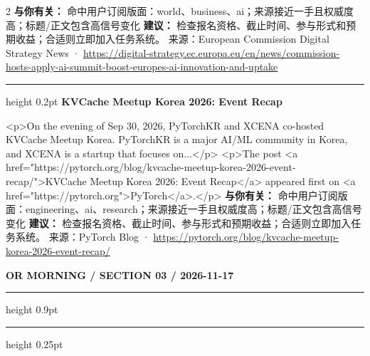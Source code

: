 \documentclass[10.5pt]{ctexart}
\begin{document}
\begin{multicols}{2}
\textbf{与你有关：} 命中用户订阅版面：world、business、ai；来源接近一手且权威度高；标题/正文包含高信号变化
\textbf{建议：} 检查报名资格、截止时间、参与形式和预期收益；合适则立即加入任务系统。
{\footnotesize\color{ormuted} 来源：European Commission Digital Strategy News · \url{https://digital-strategy.ec.europa.eu/en/news/commission-hosts-apply-ai-summit-boost-europes-ai-innovation-and-uptake}}
\vspace{2mm}
\hrule height 0.2pt
\vspace{2mm}
{\large\bfseries KVCache Meetup Korea 2026: Event Recap}\par
<p>On the evening of Sep 30, 2026, PyTorchKR and XCENA co-hosted KVCache Meetup Korea. PyTorchKR is a major AI/ML community in Korea, and XCENA is a startup that focuses on...</p> <p>The post <a href="https://pytorch.org/blog/kvcache-meetup-korea-2026-event-recap/">KVCache Meetup Korea 2026: Event Recap</a> appeared first on <a href="https://pytorch.org">PyTorch</a>.</p>
\textbf{与你有关：} 命中用户订阅版面：engineering、ai、research；来源接近一手且权威度高；标题/正文包含高信号变化
\textbf{建议：} 检查报名资格、截止时间、参与形式和预期收益；合适则立即加入任务系统。
{\footnotesize\color{ormuted} 来源：PyTorch Blog · \url{https://pytorch.org/blog/kvcache-meetup-korea-2026-event-recap/}}
\end{multicols}
\newpage
{\small\bfseries OR MORNING / SECTION 03 / 2026-11-17}
\vspace{2mm}
\hrule height 0.9pt
\vspace{1.5mm}
\hrule height 0.25pt
\vspace{4mm}
\end{document}

